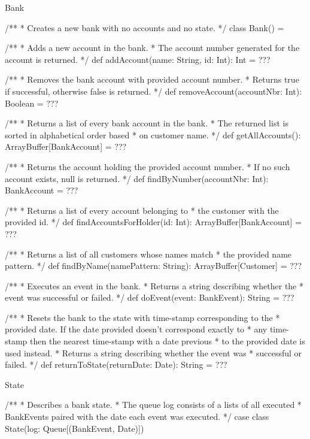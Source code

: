 \begin{ScalaSpec}{Bank}

/**
 * Creates a new bank with no accounts and no state.
 */
class Bank() = {

  /**
   * Adds a new account in the bank.
   * The account number generated for the account is returned.
   */
  def addAccount(name: String, id: Int): Int = ???

 /**
   * Removes the bank account with provided account number.
   * Returns true if successful, otherwise false is returned.
   */
  def removeAccount(accountNbr: Int): Boolean = ???

 /**
   * Returns a list of every bank account in the bank.
   * The returned list is sorted in alphabetical order based
   * on customer name.
   */
  def getAllAccounts(): ArrayBuffer[BankAccount] = ???

  /**
   * Returns the account holding the provided account number.
   * If no such account exists, null is returned.
   */
  def findByNumber(accountNbr: Int): BankAccount = ???

  /**
   * Returns a list of every account belonging to
   * the customer with the provided id.
   */
  def findAccountsForHolder(id: Int): ArrayBuffer[BankAccount] = ???

  /**
   * Returns a list of all customers whose names match
   * the provided name pattern.
   */
  def findByName(namePattern: String): ArrayBuffer[Customer] = ???

 /**
   * Executes an event in the bank.
   * Returns a string describing whether the
   * event was successful or failed.
   */
  def doEvent(event: BankEvent): String = ???

  /**
   * Resets the bank to the state with time-stamp corresponding to the
   * provided date. If the date provided doesn't correspond exactly to
   * any time-stamp then the nearest time-stamp with a date previous
   * to the provided date is used instead.
   * Returns a string describing whether the event was
   * successful or failed.
   */
  def returnToState(returnDate: Date): String = ???

}
\end{ScalaSpec}


\begin{ScalaSpec}{State}

/**
 * Describes a bank state.
 * The queue log consists of a lists of all executed
 * BankEvents paired with the date each event was executed.
 */
case class State(log: Queue[(BankEvent, Date)])

\end{ScalaSpec}


